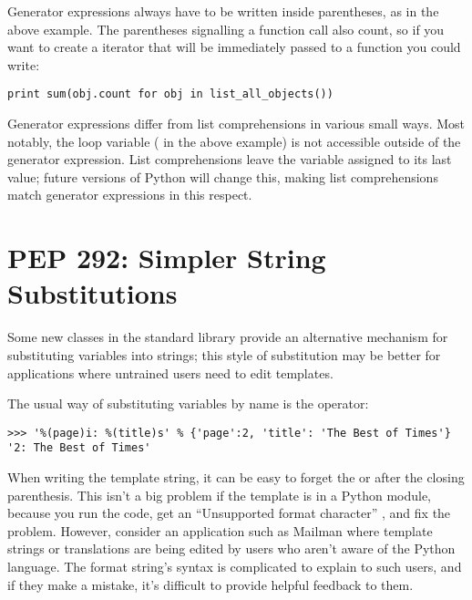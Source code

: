\documentclass{howto}
\begin{document}
Generator expressions always have to be written inside parentheses, as
in the above example.  The parentheses signalling a function call also
count, so if you want to create a iterator that will be immediately
passed to a function you could write:

\begin{verbatim}
print sum(obj.count for obj in list_all_objects())
\end{verbatim}

Generator expressions differ from list comprehensions in various small
ways.  Most notably, the loop variable ( in the above
example) is not accessible outside of the generator expression.  List
comprehensions leave the variable assigned to its last value; future
versions of Python will change this, making list comprehensions match
generator expressions in this respect.

\begin{seealso}
\end{seealso}


\section{PEP 292: Simpler String Substitutions}

Some new classes in the standard library provide an alternative
mechanism for substituting variables into strings; this style of
substitution may be better for applications where untrained
users need to edit templates.

The usual way of substituting variables by name is the \code{\%}
operator:

\begin{verbatim}
>>> '%(page)i: %(title)s' % {'page':2, 'title': 'The Best of Times'}
'2: The Best of Times'
\end{verbatim}

When writing the template string, it can be easy to forget the
 or  after the closing parenthesis.  This isn't a big
problem if the template is in a Python module, because you run the
code, get an ``Unsupported format character'' ,
and fix the problem.  However, consider an application such as Mailman
where template strings or translations are being edited by users who
aren't aware of the Python language.  The format string's syntax is
complicated to explain to such users, and if they make a mistake, it's
difficult to provide helpful feedback to them.
\end{document}
